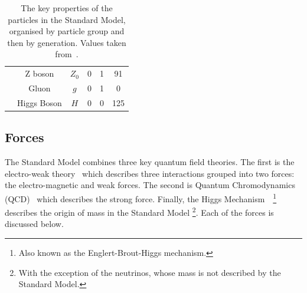 {\begin{table}[!ht]
\begin{center}
\begin{tabular}{|c|c||c|c|c|c|}
                            &Z boson          &   $Z_0$       &  0      &  1     &  91\\
                            &Gluon            &   $g$         &  0      &  1     &  0 \\
                            &Higgs Boson      &   $H$         &  0      &  0     &  125\\
    \hline  
    \end{tabular} 
  \caption[The key properties of the particles in the Standard Model]
          {The key properties of the particles in the Standard Model, organised by particle group and then by generation.
            Values taken from~\cite{obj-bjets_PDG}.}
  \label{tab:theo-sm_particles}
  \end{center}
  \end{table}}

  \newpage
\subsection{Forces}
\label{sec:theo-sm_forces}

The Standard Model combines three key quantum field theories.
The first is the electro-weak theory~\cite{theo-glashow}
which describes three interactions grouped into two forces: the electro-magnetic and weak forces.
The second is Quantum Chromodynamics (QCD)~\cite{theo-qcd} which describes the strong force.
Finally, the Higgs Mechanism~\cite{theo-higgs,theo-be}~\footnote{Also known as the Englert-Brout-Higgs mechanism.}
describes the origin of mass in the Standard Model \footnote{With the exception of the neutrinos, whose mass is not described by the Standard Model.}.
Each of the forces is discussed below.

